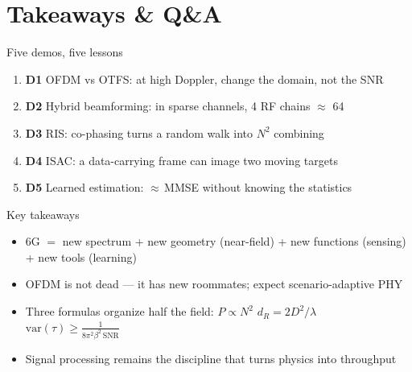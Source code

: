 \section{Takeaways \& Q\&A}

\begin{frame}{Five demos, five lessons}
  \begin{enumerate}\itemsep2pt
    \item \textbf{D1} OFDM vs OTFS: at high Doppler, \alert{change the domain},
          not the SNR
    \item \textbf{D2} Hybrid beamforming: in sparse channels,
          \alert{4 RF chains $\approx$ 64}
    \item \textbf{D3} RIS: co-phasing turns a random walk into
          \alert{$N^2$} combining
    \item \textbf{D4} ISAC: a \alert{data-carrying frame} can image two moving
          targets
    \item \textbf{D5} Learned estimation: $\approx$\,MMSE
          \alert{without knowing the statistics}
  \end{enumerate}
  \vspace{1mm}
\end{frame}

\begin{frame}{Key takeaways}
  \begin{itemize}\itemsep4pt
    \item 6G $=$ new spectrum + new geometry (near-field) + new functions
          (sensing) + new tools (learning)
    \item OFDM is not dead --- it has \alert{new roommates}; expect
          scenario-adaptive PHY
    \item Three formulas organize half the field:\quad
          $P\!\propto\!N^2$ \quad\textbullet\quad $d_R=2D^2/\lambda$
          \quad\textbullet\quad
          $\mathrm{var}(\hat\tau)\ge\frac{1}{8\pi^2\beta^2\,\mathrm{SNR}}$
    \item Signal processing remains the discipline that turns
          \alert{physics into throughput}
  \end{itemize}
\end{frame}

